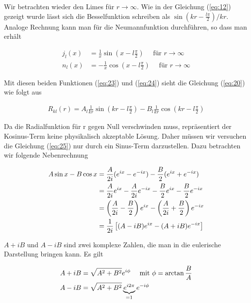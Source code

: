 Wir betrachten wieder den Limes für \(r\to\infty\). Wie in der Gleichung (\ref{eq:12}) gezeigt wurde lässt sich die Besselfunktion schreiben als \(\sin(kr-\frac{l\pi}{2})/kr \). Analoge Rechnung kann man für die Neumannfunktion durchführen, so dass man erhält

\begin{align}
j_l(x) &= \frac{1}{x}\sin\left(x - l\frac{\pi}{2}\right) \quad \text{ für }r\to\infty  \label{eq:23} \\
n_l(x) &= - \frac{1}{x}\cos\left(x - l\frac{\pi}{2}\right)\quad \text{ für }r\to\infty \label{eq:24}
\end{align}

Mit diesen beiden Funktionen (\ref{eq:23}) und (\ref{eq:24}) sieht die Gleichung (\ref{eq:20}) wie folgt aus

\begin{align}
  \label{eq:25}
   R_{kl}(r) = A_l \frac{1}{kr}\sin\left(kr - l\frac{\pi}{2}\right) - B_l  \frac{1}{kr}\cos\left(kr - l\frac{\pi}{2}\right)
\end{align}

Da die Radialfunktion für r gegen Null verschwinden muss, repräsentiert der Kosinus-Term keine physikalisch akzeptable Lösung. Daher müssen wir versuchen die Gleichung (\ref{eq:25}) nur durch ein Sinus-Term darzustellen. Dazu betrachten wir folgende Nebenrechnung

\begin{align}
  \label{eq:26}
  A\sin x - B\cos x &= \frac{A}{2i}(e^{ix}-e^{-ix}) - \frac{B}{2}(e^{ix}+e^{-ix}) \notag\\
&=\frac{A}{2i}e^{ix} - \frac{A}{2i}e^{-ix} - \frac{B}{2}e^{ix} - \frac{B}{2}e^{-ix} \notag\\
&=\left( \frac{A}{2i} - \frac{B}{2} \right) e^{ix}- \left( \frac{A}{2i} + \frac{B}{2} \right) e^{-ix}\notag\\
&= \frac{1}{2i} \left[( A - iB) e^{ix}- ( A + iB) e^{-ix}\right]
\end{align}

\(A+iB\) und \(A-iB\) sind zwei komplexe Zahlen, die man in die eulerische Darstellung bringen kann. Es gilt

\begin{align}
  A+iB &= \sqrt{A^2+B^2}e^{i\phi} \quad \text{ mit }\phi=\arctan \frac{B}{A}  \label{eq:27} \\
  A-iB &= \sqrt{A^2+B^2}\underbr{e^{i2\pi}}_{=1}e^{-i\phi}  \label{eq:28} \\
\end{align}

